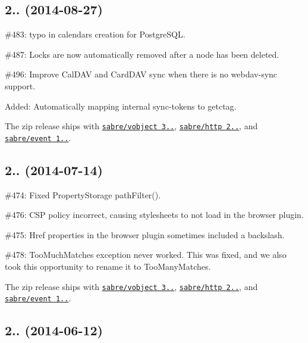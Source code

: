 \subsection*{2.. (2014-\/08-\/27) }


\begin{DoxyItemize}
\item \#483\+: typo in calendars creation for Postgre\+S\+QL.
\item \#487\+: Locks are now automatically removed after a node has been deleted.
\item \#496\+: Improve Cal\+D\+AV and Card\+D\+AV sync when there is no webdav-\/sync support.
\item Added\+: Automatically mapping internal sync-\/tokens to getctag.
\item The zip release ships with \href{http://sabre.io/vobject/}{\tt sabre/vobject 3..}, \href{http://sabre.io/http/}{\tt sabre/http 2..}, and \href{http://sabre.io/event/}{\tt sabre/event 1..}.
\end{DoxyItemize}

\subsection*{2.. (2014-\/07-\/14) }


\begin{DoxyItemize}
\item \#474\+: Fixed Property\+Storage {\ttfamily path\+Filter()}.
\item \#476\+: C\+SP policy incorrect, causing stylesheets to not load in the browser plugin.
\item \#475\+: Href properties in the browser plugin sometimes included a backslash.
\item \#478\+: {\ttfamily Too\+Much\+Matches} exception never worked. This was fixed, and we also took this opportunity to rename it to {\ttfamily Too\+Many\+Matches}.
\item The zip release ships with \href{http://sabre.io/vobject/}{\tt sabre/vobject 3..}, \href{http://sabre.io/http/}{\tt sabre/http 2..}, and \href{http://sabre.io/event/}{\tt sabre/event 1..}.
\end{DoxyItemize}

\subsection*{2.. (2014-\/06-\/12) }


